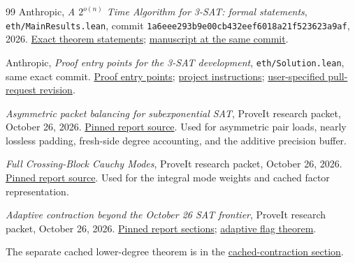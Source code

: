 \begin{thebibliography}{99}
Anthropic, \emph{A $2^{o(n)}$ Time Algorithm for 3-SAT: formal statements}, \texttt{eth/MainResults.lean}, commit \texttt{1a6eee293b9e00cb432eef6018a21f523623a9af}, 2026. \href{https://github.com/anthropics/formal-math/blob/1a6eee293b9e00cb432eef6018a21f523623a9af/eth/MainResults.lean}{Exact theorem statements}; \href{https://github.com/anthropics/formal-math/blob/1a6eee293b9e00cb432eef6018a21f523623a9af/eth/paper.pdf}{manuscript at the same commit}.

Anthropic, \emph{Proof entry points for the 3-SAT development}, \texttt{eth/Solution.lean}, same exact commit. \href{https://github.com/anthropics/formal-math/blob/1a6eee293b9e00cb432eef6018a21f523623a9af/eth/Solution.lean}{Proof entry points}; \href{https://github.com/anthropics/formal-math/blob/1a6eee293b9e00cb432eef6018a21f523623a9af/eth/README.md}{project instructions}; \href{https://github.com/anthropics/formal-math/pull/31/changes/1a6eee293b9e00cb432eef6018a21f523623a9af}{user-specified pull-request revision}.

\emph{Asymmetric packet balancing for subexponential SAT}, ProveIt research packet, October 26, 2026. \href{https://github.com/VladimirReshetnikov/ProveIt/blob/8e76d515063c4b9fbd8743a846b457e3a01bc039/Computability/SubexponentialSAT/Research/eth_asymmetric_packet_balancing/report.tex}{Pinned report source}. Used for asymmetric pair loads, nearly lossless padding, fresh-side degree accounting, and the additive precision buffer.

\emph{Full Crossing-Block Cauchy Modes}, ProveIt research packet, October 26, 2026. \href{https://github.com/VladimirReshetnikov/ProveIt/blob/8e76d515063c4b9fbd8743a846b457e3a01bc039/Computability/SubexponentialSAT/Research/eth_joint_cauchy/report.tex}{Pinned report source}. Used for the integral mode weights and cached factor representation.

\emph{Adaptive contraction beyond the October 26 SAT frontier}, ProveIt research packet, October 26, 2026. \href{https://github.com/VladimirReshetnikov/ProveIt/tree/8e76d515063c4b9fbd8743a846b457e3a01bc039/Computability/SubexponentialSAT/Research/sat_adaptive_bounds/report}{Pinned report sections}; \href{https://github.com/VladimirReshetnikov/ProveIt/blob/8e76d515063c4b9fbd8743a846b457e3a01bc039/Computability/SubexponentialSAT/Research/sat_adaptive_bounds/report/flags.tex}{adaptive flag theorem}.

The separate cached lower-degree theorem is in the
\href{https://github.com/VladimirReshetnikov/ProveIt/blob/8e76d515063c4b9fbd8743a846b457e3a01bc039/Computability/SubexponentialSAT/Research/sat_adaptive_bounds/report/cached.tex}{cached-contraction section}.


\end{thebibliography}
